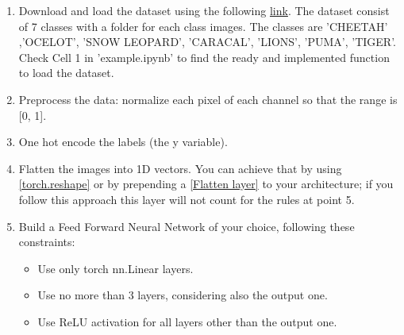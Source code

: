\documentclass[11pt]{scrartcl}
\begin{document}
\begin{enumerate}
\item Download and load the dataset using the following \href{https://drive.switch.ch/index.php/s/XSnhQDNar7y46oQ}{link}.  The dataset consist of 7 classes with a folder for each class images. The classes are 'CHEETAH' ,'OCELOT', 'SNOW LEOPARD', 'CARACAL', 'LIONS', 'PUMA', 'TIGER'. Check Cell 1 in 'example.ipynb' to find the ready and implemented function to load the dataset. 

\item Preprocess the data: normalize each pixel of each channel so that the range is [0, 1].
\item One hot encode the labels (the y variable).

\item Flatten the images into 1D vectors. You can achieve that by using \href{https://pytorch.org/docs/stable/generated/torch.reshape.html}{[torch.reshape]} or by prepending a \href{https://pytorch.org/docs/stable/generated/torch.nn.Flatten.html}{[Flatten layer]} to your architecture; if you follow this approach this layer will not count for the rules at point 5.

\item Build a Feed Forward Neural Network of your choice, following these constraints:
\begin{itemize}
	\item Use only torch nn.Linear layers.
	\item Use no more than 3 layers, considering also the output one.
	\item Use ReLU activation for all layers other than the output one.
\end{itemize}


\end{enumerate}
\end{document}
